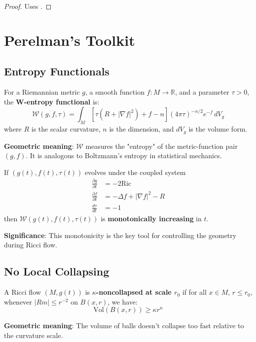 \begin{proof}
Uses .
\end{proof}

\chapter{Perelman's Toolkit}
\label{chap:perelman_toolkit}

\section{Entropy Functionals}

\begin{definition}[W-Entropy]
\label{def:w_entropy}
For a Riemannian metric $g$, a smooth function $f : M \to \mathbb{R}$, and a parameter $\tau > 0$, the \textbf{W-entropy functional} is:
\[
\mathcal{W}(g, f, \tau) = \int_M \left[\tau(R + |\nabla f|^2) + f - n\right] (4\pi\tau)^{-n/2} e^{-f} \, dV_g
\]
where $R$ is the scalar curvature, $n$ is the dimension, and $dV_g$ is the volume form.

\textbf{Geometric meaning}: $\mathcal{W}$ measures the "entropy" of the metric-function pair $(g, f)$. It is analogous to Boltzmann's entropy in statistical mechanics.
\end{definition}

\begin{theorem}
\label{thm:w_entropy_monotone}
If $(g(t), f(t), \tau(t))$ evolves under the coupled system
\begin{align*}
\frac{\partial g}{\partial t} &= -2 \text{Ric} \\
\frac{\partial f}{\partial t} &= -\Delta f + |\nabla f|^2 - R \\
\frac{d\tau}{dt} &= -1
\end{align*}
then $\mathcal{W}(g(t), f(t), \tau(t))$ is \textbf{monotonically increasing} in $t$.

\textbf{Significance}: This monotonicity is the key tool for controlling the geometry during Ricci flow.
\end{theorem}

\section{No Local Collapsing}

\begin{definition}
\label{def:kappa_noncollapsing}
A Ricci flow $(M, g(t))$ is \textbf{$\kappa$-noncollapsed at scale $r_0$} if for all $x \in M$, $r \leq r_0$, whenever $|Rm| \leq r^{-2}$ on $B(x, r)$, we have:
\[
\text{Vol}(B(x, r)) \geq \kappa r^n
\]

\textbf{Geometric meaning}: The volume of balls doesn't collapse too fast relative to the curvature scale.
\end{definition}

